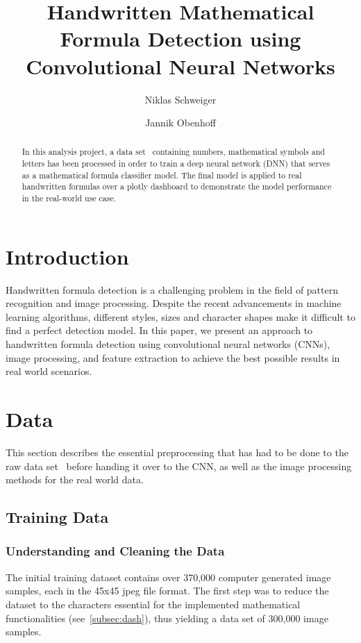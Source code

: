 \documentclass[@CLASSOPTIONS@]{tumarticle}
\title{Handwritten Mathematical Formula Detection using Convolutional Neural Networks}
\author[affil={1}, email={niklas.schweiger@tum.de}]{Niklas Schweiger}
\author[affil={1}, email={jannik.obenhoff@tum.de}]{Jannik Obenhoff}
\affil{Department of Electrical and Computer Engineering, Technical
  University of Munich, Arcisstr. 21, 80333 Munich, Germany}
\begin{document}
\twocolumn

\maketitle
\begin{abstract}
  In this analysis project, a data set~\cite{kaggledataset} containing numbers, mathematical
  symbols and letters has been processed in order to train a deep neural network (DNN) that
  serves as a mathematical formula classifier model.
  The final model is applied to real handwritten formulas over a plotly dashboard to demonstrate the model
  performance in the real-world use case.

\end{abstract}

\section{Introduction}

Handwritten formula detection is a challenging problem in the field of pattern recognition and
image processing.
Despite the recent advancements in machine learning algorithms, different styles, sizes and character
shapes make it difficult to find a perfect detection model.
In this paper, we present an approach to handwritten formula detection using convolutional
neural networks (CNNs), image processing, and feature extraction to achieve the best possible results
in real world scenarios.

\section{Data}
\label{sec:measures}

This section describes the essential preprocessing that has had to be done to the raw
data set~\cite{kaggledataset} before handing it over to the CNN,
as well as the image processing methods for the real world data.

\subsection{Training Data}
\subsubsection{Understanding and Cleaning the Data}

The initial training dataset contains over 370,000 computer generated image samples, each in the 45x45 jpeg file format.
The first step was to reduce the dataset to the characters essential for the
implemented mathematical functionalities (see~\ref{subsec:dash}),
thus yielding a data set of 300,000 image samples.
\end{document}
